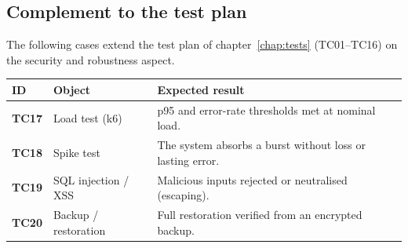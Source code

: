 \subsection{Complement to the test plan}
The following cases extend the test plan of chapter~\ref{chap:tests}
(TC01--TC16) on the security and robustness aspect.
\begin{xltabular}{\textwidth}{>{\bfseries}p{1.6cm} p{4.4cm} X}
\toprule
\textbf{ID} & \textbf{Object} & \textbf{Expected result} \\
\midrule
\endhead
TC17 & Load test (k6) & p95 and error-rate thresholds met at nominal load. \\
TC18 & Spike test & The system absorbs a burst without loss or lasting error. \\
TC19 & SQL injection / XSS & Malicious inputs rejected or neutralised (escaping). \\
TC20 & Backup / restoration & Full restoration verified from an encrypted backup. \\
\bottomrule
\end{xltabular}

